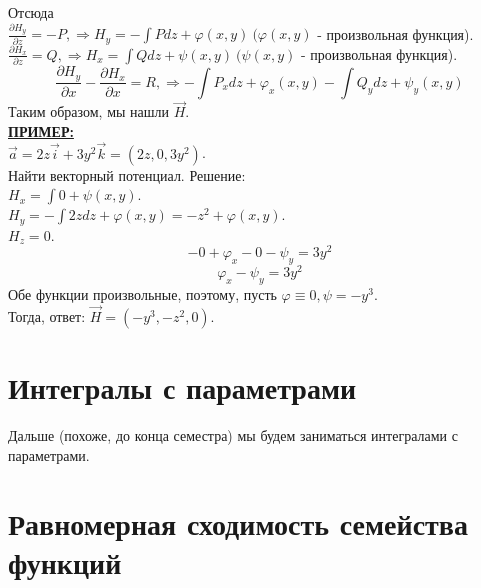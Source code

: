 \documentclass[12pt]{article}
\begin{document}
Отсюда \\$\frac{\partial H_y}{\partial z} = -P, \Rightarrow H_y = -\int Pdz + \varphi(x,y) \ (\varphi(x,y)$ - произвольная функция).\\
\indent $\frac{\partial H_x}{\partial z} = Q, \Rightarrow H_x = \int Qdz + \psi(x,y) \ (\psi(x,y)$ - произвольная функция).\\
$$\frac{\partial H_y}{\partial x} - \frac{\partial H_x}{\partial x} = R, \Rightarrow -\int P_x dz + \varphi_x(x,y) - \int Q_y dz + \psi_y(x,y)$$
Таким образом, мы нашли $\overrightarrow{H}$.\\
\uline{\textbf{ПРИМЕР:}}\\
$\overrightarrow{a} = 2 z \overrightarrow{i} + 3 y^2 \overrightarrow{k} = (2z, 0, 3y^2)$.\\
Найти векторный потенциал. Решение:\\
$H_x = \int 0 + \psi (x,y)$.\\
$H_y = -\int 2z dz + \varphi (x,y) = -z^2 + \varphi(x,y)$.\\
$H_z = 0$.\\
$$-0 + \varphi_x - 0 - \psi_y = 3y^2$$
$$\varphi_x - \psi_y = 3y^2$$
Обе функции произвольные, поэтому, пусть $\varphi \equiv 0, \psi = -y^3$.\\
Тогда, ответ: $\overrightarrow{H} = (-y^3, -z^2, 0)$.\\
\section{Интегралы с параметрами}
Дальше (похоже, до конца семестра) мы будем заниматься интегралами с параметрами.\\
\section{Равномерная сходимость семейства функций}
\end{document}
